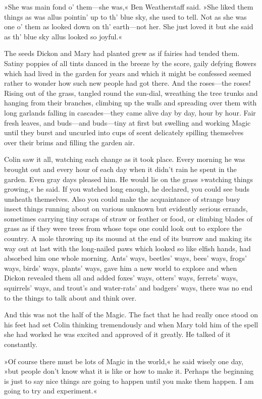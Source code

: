 »She was main fond o' them—she was,« Ben Weatherstaff said. »She liked them things as was allus pointin' up to th' blue sky, she used to tell. Not as she was one o' them as looked down on th' earth—not her. She just loved it but she said as th' blue sky allus looked so joyful.«

The seeds Dickon and Mary had planted grew as if fairies had tended them. Satiny poppies of all tints danced in the breeze by the score, gaily defying flowers which had lived in the garden for years and which it might be confessed seemed rather to wonder how such new people had got there. And the roses—the roses! Rising out of the grass, tangled round the sun-dial, wreathing the tree trunks and hanging from their branches, climbing up the walls and spreading over them with long garlands falling in cascades—they came alive day by day, hour by hour. Fair fresh leaves, and buds—and buds—tiny at first but swelling and working Magic until they burst and uncurled into cups of scent delicately spilling themselves over their brims and filling the garden air.

Colin saw it all, watching each change as it took place. Every morning he was brought out and every hour of each day when it didn't rain he spent in the garden. Even gray days pleased him. He would lie on the grass »watching things growing,« he said. If you watched long enough, he declared, you could see buds unsheath themselves. Also you could make the acquaintance of strange busy insect things running about on various unknown but evidently serious errands, sometimes carrying tiny scraps of straw or feather or food, or climbing blades of grass as if they were trees from whose tops one could look out to explore the country. A mole throwing up its mound at the end of its burrow and making its way out at last with the long-nailed paws which looked so like elfish hands, had absorbed him one whole morning. Ants' ways, beetles' ways, bees' ways, frogs' ways, birds' ways, plants' ways, gave him a new world to explore and when Dickon revealed them all and added foxes' ways, otters' ways, ferrets' ways, squirrels' ways, and trout's and water-rats' and badgers' ways, there was no end to the things to talk about and think over.

And this was not the half of the Magic. The fact that he had really once stood on his feet had set Colin thinking tremendously and when Mary told him of the spell she had worked he was excited and approved of it greatly. He talked of it constantly.

»Of course there must be lots of Magic in the world,« he said wisely one day, »but people don't know what it is like or how to make it. Perhaps the beginning is just to say nice things are going to happen until you make them happen. I am going to try and experiment.«

